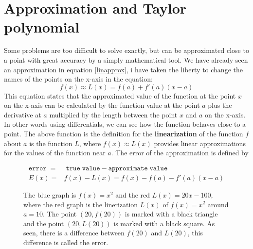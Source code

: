 \documentclass[main.tex]{subfiles}
\begin{document}
\section{Approximation and Taylor polynomial}

Some problems are too difficult to solve exactly, but can be approximated close to a point with great accuracy by a simply mathematical tool. We have already seen an approximation in equation \ref{linapprox}, i have taken the liberty to change the names of the points on the x-axis in the equation: 
\begin{equation}
f(x) \approx L(x) = f(a) + f'(a)(x-a)
\end{equation}
This equation states that the approximated value of the function at the point $x$ on the x-axis can be calculated by the function value at the point $a$ plus the derivative at $a$ multiplied by the length between the point $x$ and $a$ on the x-axis. In other words using differentials, we can see how the function behaves close to a point. The above function is the definition for the \textbf{linearization} of the function $f$ about $a$ is the function $L$, where $f(x) \approx L(x)$ provides linear approximations for the values of the function near $a$. The error of the approximation is defined by

\begin{align}
\mathtt{error} \; =& \; \mathtt{true \; value} - \mathtt{approximate \; value} \\
E(x) =& f(x) - L(x) = f(x) - f(a) - f'(a)(x-a)
\end{align}

\begin{figure}
\begin{center}
\caption{The blue graph is $f(x)=x^2$ and the red $L(x)=20x-100$, where the red graph is the linerization $L(x)$ of $f(x)=x^2$ around $a=10$. The point $(20,f(20))$ is marked with a black triangle and the point $(20,L(20))$ is marked with a black square. As seen, there is a difference between $f(20)$ and $L(20)$, this difference is called the error.}
\end{center}
\end{figure}
\end{document}
